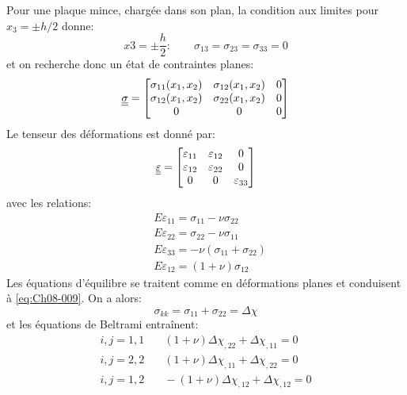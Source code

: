 Pour une plaque mince, chargée dans son plan, la condition aux limites pour 
$x_3=\pm h/2$ donne: 
\begin{equation}
  x3 = \pm \frac{h}{2} : \qquad \sigma_{13}=\sigma_{23}=\sigma_{33}=0
\label{eq:Ch08-014}
\end{equation}
et on recherche donc un état de contraintes planes: 
\begin{equation}
  \underline{\underline{\sigma}}=\begin{bmatrix}
     \sigma_{11}(x_1,x_2) & \sigma_{12}(x_1,x_2) & 0 \\
     \sigma_{12}(x_1,x_2) & \sigma_{22}(x_1,x_2) & 0 \\
      0                   &  0                   & 0 
   \end{bmatrix}
\label{eq:Ch08-015}
\end{equation}
Le tenseur des déformations est donné par:
\begin{equation}
  \underline{\underline{\varepsilon}} = \begin{bmatrix}
     \varepsilon_{11} & \varepsilon_{12} & 0           \\
     \varepsilon_{12} & \varepsilon_{22} & 0           \\
      0               &  0               & \varepsilon_{33} 
   \end{bmatrix}
\label{eq:Ch08-016}
\end{equation}
avec les relations:
\begin{equation}
    \begin{aligned}
        &E \varepsilon_{11}  = \sigma_{11}-\nu\sigma_{22}\\
        &E \varepsilon_{22}  = \sigma_{22}-\nu\sigma_{11}\\
        &E \varepsilon_{33}  = -\nu (\sigma_{11}+\sigma_{22})\\
        &E \varepsilon_{12}  = (1+\nu)\sigma_{12}
    \end{aligned}
    \label{eq:Ch08-017}
\end{equation}
Les équations d'équilibre se traitent comme en déformations planes et conduisent à \eqref{eq:Ch08-009}. 
On a alors: 
\begin{equation}
  \sigma_{kk}=\sigma_{11}+\sigma_{22}=\Delta\chi
\label{eq:Ch08-018}
\end{equation}
et les équations de Beltrami entraînent: 
\begin{equation}
  \begin{aligned}
    i,j=1,1  &\quad  (1+\nu) \Delta\chi_{,22}+\Delta\chi_{,11} = 0\\
    i,j=2,2  &\quad  (1+\nu) \Delta\chi_{,11}+\Delta\chi_{,22} = 0\\
    i,j=1,2  &\quad -(1+\nu) \Delta\chi_{,12}+\Delta\chi_{,12} = 0
  \end{aligned}
\label{eq:Ch08-019}
\end{equation}
